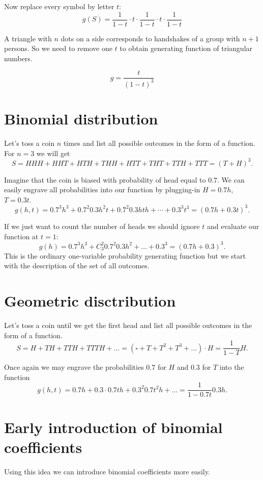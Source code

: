 \documentclass{article}
\begin{document}
Now replace every symbol by letter $t$:
\[
g(S) = 	\frac{1}{1-t} \cdot  t \cdot  \frac{1}{1-t} \cdot t \cdot \frac{1}{1-t} 
\]


A triangle with $n$ dots on a side corresponds to handshakes of a group with $n+1$ persons.
So we need to remove one $t$ to obtain generating function of triangular numbers.

\[
g = \frac{t}{(1-t)^3}
\]


\section{Binomial distribution}

Let's toss a coin $n$ times and list all possible outcomes in the form of a function.
For $n=3$ we will get
\[
S = HHH + HHT + HTH + THH + HTT + THT + TTH + TTT = (T + H)^3.
\]

Imagine that the coin is biased with probability of head equal to $0.7$. 
We can easily engrave all probabilities into our function by plugging-in $H=0.7h$, $T=0.3t$.
\[
g(h, t) = 0.7^3 h^3 + 0.7^2 0.3 h^2 t + 0.7^2 0.3 hth + \cdots + 0.3^3 t^3 = (0.7 h + 0.3t)^3.
\]

If we just want to count the number of heads we should ignore $t$ and evaluate our function at $t=1$:
\[
g(h) = 0.7^3 h^3 + C_3^2 0.7^2 0.3 h^2 + \ldots + 0.3^3 = (0.7h + 0.3)^3. 
\]
This is the ordinary one-variable probability generating function but we start with the description of 
the set of all outcomes. 


\section{Geometric disctribution}

Let's toss a coin until we get the first head and list all possible outcomes in the form of a function.
\[
S = H + TH + TTH + TTTH + \ldots = (\square + T + T^2 + T^3 + \ldots) \cdot H = \frac{1}{1-T} H.
\]

Once again we may engrave the probabilities $0.7$ for $H$ and $0.3$ for $T$ into the function 
\[
g(h, t) = 0.7h + 0.3\cdot 0.7 th + 0.3^2 0.7 t^2 h +\ldots = \frac{1}{1-0.7t}0.3h.
\]

\section{Early introduction of binomial coefficients}

Using this idea we can introduce binomial coefficients more easily. 
\end{document}
